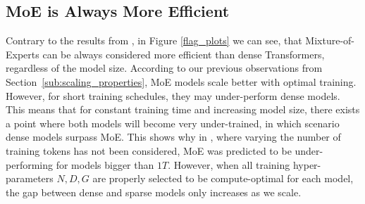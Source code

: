 









\subsection{MoE is Always More Efficient} \label{moe_more_eff}
Contrary to the results from \cite{clark2022unified}, in Figure \ref{flag_plots} we can see, that Mixture-of-Experts can be always considered more efficient than dense Transformers, regardless of the model size. According to our previous observations from Section~\ref{sub:scaling_properties}, MoE models scale better with optimal training. However, for short training schedules, they may under-perform dense models. This means that for constant training time and increasing model size, there exists a point where both models will become very under-trained, in which scenario dense models surpass MoE. This shows why in \cite{clark2022unified}, where varying the number of training tokens has not been considered, MoE was predicted to be under-performing for models bigger than $1T$. However, when all training hyper-parameters $N,D,G$ are properly selected to be compute-optimal for each model, the gap between dense and sparse models only increases as we scale.


